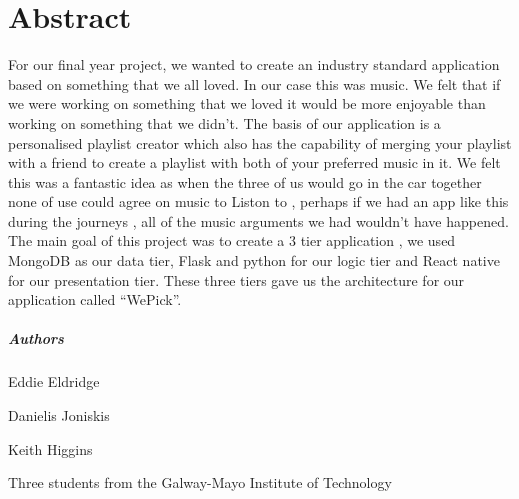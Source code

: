 
\chapter*{Abstract}
For our final year project, we wanted to create an industry standard application based on something that we all loved. In our case this was music. We felt that if we were working on something that we loved it would be more enjoyable than working on something that we didn’t. The basis of our application is a personalised playlist creator which also has the capability of merging your playlist with a friend to create a playlist with both of your preferred music in it. We felt this was a fantastic idea as when the three of us would go in the car together none of use could agree on music to Liston to ,  perhaps if we had an app like this during the journeys , all of the music arguments we had wouldn’t have happened. The main goal of this project was to create a 3 tier application , we used MongoDB as our data tier, Flask and python for our logic tier and React native for our presentation tier. These three tiers gave us the architecture for our application called “WePick”.

\paragraph{Authors}
\begin{flushleft}
	Eddie Eldridge
	
	Danielis Joniskis
	
	Keith Higgins 
	
	Three students from the Galway-Mayo Institute of Technology
\end{flushleft}



